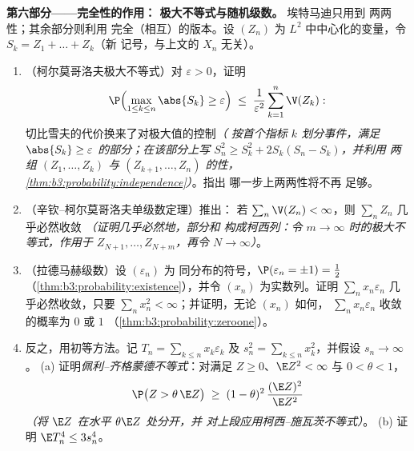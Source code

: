 \begin{problem}
\medskip
\noindent\textbf{第六部分——完全性的作用：
极大不等式与随机级数。} 埃特马迪只用到
两两性；其余部分则利用
完全（相互）的版本。设 $(Z_n)$ 为
$L^2$ 中中心化的变量，令 $S_k = Z_1 + \dots + Z_k$（新
记号，与上文的 $X_n$ 无关）。
\begin{enumerate}[resume]
  \item （柯尔莫哥洛夫极大不等式）对 $\varepsilon
        > 0$，证明
        \[
        \P\Bigl(\max_{1\leq k\leq n}\abs{S_k} \geq
        \varepsilon\Bigr) \;\leq\;
        \frac1{\varepsilon^2}\sum_{k=1}^n\V(Z_k) :
        \]
        切比雪夫的代价换来了对极大值的控制\emph{（
        按首个指标 $k$ 划分事件，满足
        $\abs{S_k} \geq \varepsilon$ 的部分；在该部分上写
        $S_n^2 \geq S_k^2 + 2S_k(S_n - S_k)$，并利用
        两组 $(Z_1, \dots, Z_k)$ 与
        $(Z_{k+1}, \dots, Z_n)$ 的性，
        \cref{thm:b3:probability:independence}）}。指出
        哪一步上两两性将不再
        足够。
  \item （辛钦–柯尔莫哥洛夫单级数定理）推出：
        若 $\sum_n\V(Z_n) < \infty$，则 $\sum_nZ_n$
        几乎必然收敛 \emph{（证明几乎必然地，部分和
        构成柯西列：令 $m \to
        \infty$ 时的极大不等式，作用于
        $Z_{N+1}, \dots, Z_{N+m}$，再令 $N \to
        \infty$）}。
  \item （拉德马赫级数）设 $(\varepsilon_n)$ 为
        同分布的符号，$\P(\varepsilon_n = \pm1) =
        \frac12$（\cref{thm:b3:probability:existence}），并令
        $(x_n)$ 为实数列。证明
        $\sum_nx_n\varepsilon_n$ 几乎必然收敛，只要
        $\sum_nx_n^2 < \infty$；并证明，无论
        $(x_n)$ 如何，
        $\sum_nx_n\varepsilon_n$ 收敛的概率为 $0$ 或 $1$
        （\cref{thm:b3:probability:zeroone}）。
  \item 反之，用初等方法。记 $T_n = \sum_{k\leq
        n}x_k\varepsilon_k$ 及 $s_n^2 = \sum_{k\leq
        n}x_k^2$，并假设 $s_n \to \infty$。
        (a) 证明\emph{佩利–齐格蒙德不等式}：对满足
        $Z \geq 0$、$\E Z^2 < \infty$ 与 $0 < \theta <
        1$，
        \[
        \P\bigl(Z > \theta\,\E Z\bigr) \;\geq\; (1 -
        \theta)^2\,\frac{(\E Z)^2}{\E Z^2}
        \]
        \emph{（将 $\E Z$ 在水平 $\theta\E Z$ 处分开，并
        对上段应用柯西–施瓦茨不等式）}。
        (b) 证明 $\E T_n^4 \leq 3s_n^4$。

\end{enumerate}
\end{problem}
